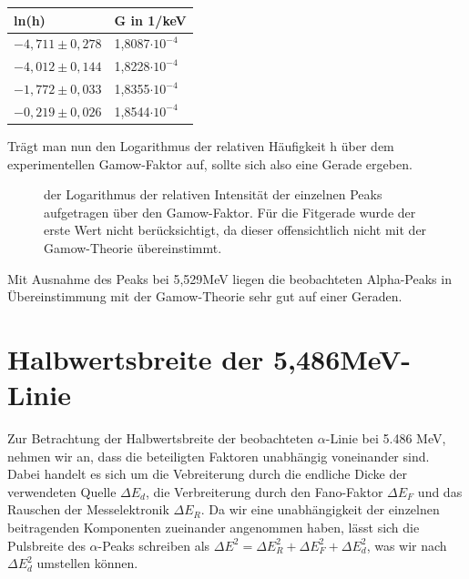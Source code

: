 \documentclass[bigchapter,colorback,accentcolor=tud4b,linedtoc,11pt]{tudreport}
\begin{document}
\color{blue}
\begin{center}
  \begin{tabular}{p{4cm}p{5cm}}
    ln(h)              & G in 1/keV            \\ \hline
    $-4,711 \pm 0,278$ & 1,8087$\cdot 10^{-4}$ \\
    $-4,012 \pm 0,144$ & 1,8228$\cdot 10^{-4}$ \\
    $-1,772 \pm 0,033$ & 1,8355$\cdot 10^{-4}$ \\
    $-0,219 \pm 0,026$ & 1,8544$\cdot 10^{-4}$ \\
    \end{tabular}
\end{center}

\color{black}

Trägt man nun den Logarithmus der relativen Häufigkeit h über dem experimentellen Gamow-Faktor auf, sollte sich also eine Gerade ergeben.

\begin{figure}[H]
    \caption{der Logarithmus der relativen Intensität der einzelnen Peaks
      aufgetragen über den Gamow-Faktor. Für die Fitgerade wurde der erste Wert
      nicht berücksichtigt, da dieser offensichtlich nicht mit der Gamow-Theorie
    übereinstimmt.}
\end{figure}

Mit Ausnahme des Peaks bei 5,529MeV liegen die beobachteten Alpha-Peaks in
Übereinstimmung mit der Gamow-Theorie sehr gut auf einer Geraden. 

\section{Halbwertsbreite der 5,486MeV-Linie}
Zur Betrachtung der Halbwertsbreite der beobachteten $\alpha$-Linie bei 5.486
MeV, nehmen wir an, dass die beteiligten Faktoren unabhängig voneinander
sind. Dabei handelt es sich um die Vebreiterung durch die endliche Dicke der
verwendeten Quelle $\Delta E_d$, die Verbreiterung durch den Fano-Faktor $\Delta
E_F$ und das Rauschen der Messelektronik $\Delta E_R$. Da wir eine
unabhängigkeit der einzelnen beitragenden Komponenten zueinander angenommen haben, lässt
sich die Pulsbreite des $\alpha$-Peaks schreiben als $\Delta E^2 = \Delta E_R^2
+ \Delta E_F^2 + \Delta E_d^2$, was wir nach $\Delta E_d^2$ umstellen können.
\end{document}
